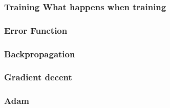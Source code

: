 \subsubsection{Training What happens when training}


\subsubsection{Error Function}


\subsubsection{Backpropagation}


\subsubsection{Gradient decent}


\subsubsection{Adam}

